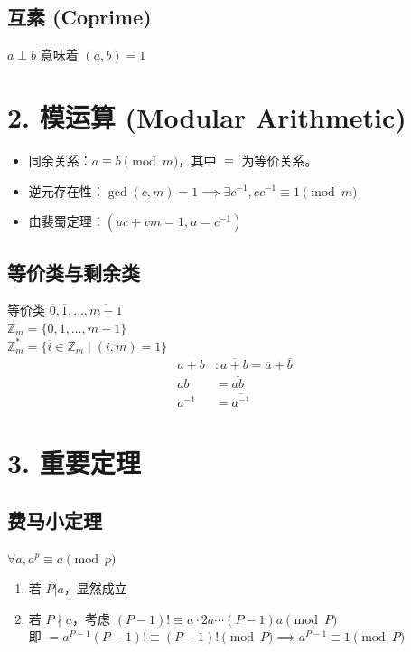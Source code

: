 \documentclass[12pt, a4paper]{article}
\begin{document}
\subsection*{互素 (Coprime)}
\(a \perp b\) 意味着 \((a,b)=1\)

\section*{2. 模运算 (Modular Arithmetic)}

\begin{itemize}
    \item 同余关系：\(a \equiv b \pmod m\)，其中 \(\equiv\) 为等价关系。
    \item 逆元存在性：\(\gcd(c,m)=1 \implies \exists c^{-1}, cc^{-1} \equiv 1 \pmod m\)
    \item 由裴蜀定理：\((uc+vm=1, u=c^{-1})\)
\end{itemize}

\subsection*{等价类与剩余类}
等价类 \(\overline{0}, \overline{1}, \dots, \overline{m-1}\) \\
\(\mathbb{Z}_m = \{0, 1, \dots, m-1\}\) \\
\(\mathbb{Z}_m^* = \{\overline{i} \in \mathbb{Z}_m \mid (i,m)=1\}\)
\begin{align*}
    a+b &: \overline{a+b} = \overline{a} + \overline{b} \\
    ab &= \overline{ab} \\
    a^{-1} &= \overline{a^{-1}}
\end{align*}

\section*{3. 重要定理}

\subsection*{费马小定理}
\(\forall a, a^p \equiv a \pmod p\)
\begin{enumerate}
    \item 若 \(P|a\)，显然成立 \checkmark{}
    \item 若 \(P \nmid a\)，考虑 \((P-1)! \equiv a \cdot 2a \cdots (P-1)a \pmod P\) \\
    即 \(= a^{P-1}(P-1)! \equiv (P-1)! \pmod P \implies a^{P-1} \equiv 1 \pmod P\)
\end{enumerate}
\end{document}
